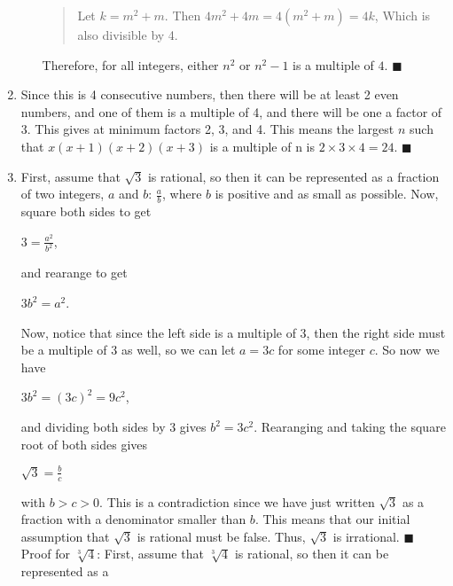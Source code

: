 \documentclass[12pt]{article}
\begin{document}
\begin{enumerate}
\begin{enumerate}
\begin{quote}
\begin{center}
                        \end{center}
                        Let $k = m^2 + m$. Then
                        $4m^2 + 4m = 4(m^2+m) = 4k$,
                        Which is also divisible by 4.
                    \end{quote}
                    Therefore, for all integers, either $n^2$ or $n^2-1$ is a multiple
                    of $4$. \hfill $\blacksquare$
          \end{enumerate}
    \item Since this is 4 consecutive numbers, then there will be at least 2 even
          numbers, and one of them is a multiple of 4, and there will be one a factor of
          3. This gives at minimum factors 2, 3, and 4. This means the largest $n$ such
          that $x(x+1)(x+2)(x+3)$ is a multiple of n is $2 \times 3 \times 4 = 24$.
          \hfill $\blacksquare$
    \item First, assume that $\sqrt{3}$ is rational, so then it can be represented as a
          fraction of two integers, $a$ and $b$: $\frac{a}{b}$, where $b$ is positive and
          as small as possible. Now, square both sides to get
          \begin{center}
              $3 = \frac{a^2}{b^2}$,
          \end{center}
          and rearange to get
          \begin{center}
              $3b^2 = a^2$.
          \end{center}
          Now, notice that since the left side is a multiple of 3, then the right side
          must be a multiple of 3 as well, so we can let $a = 3c$ for some integer $c$.
          So now we have
          \begin{center}
              $3b^2 = (3c)^2 = 9c^2$,
          \end{center}
          and dividing both sides by 3 gives $b^2 = 3c^2$. Rearanging and taking the
          square root of both sides gives
          \begin{center}
              $\sqrt{3} = \frac{b}{c}$
          \end{center}
          with $b>c>0$. This is a contradiction since we have just written $\sqrt{3}$
          as a fraction with a denominator smaller than $b$. This means that our
          initial assumption that $\sqrt{3}$ is rational must be false. Thus, $\sqrt{3}$
          is irrational. \hfill $\blacksquare$\newline
          Proof for $\sqrt[3]{4}$:
          First, assume that $\sqrt[3]{4}$ is rational, so then it can be represented as a

\end{enumerate}
\end{document}
